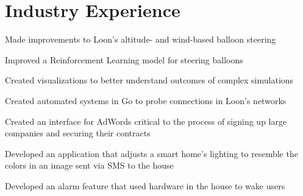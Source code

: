 \documentclass[letterpaper]{deedy-resume} %
\begin{document}
\begin{minipage}[t]{0.66\textwidth} %


\section{Industry Experience}


\vspace{\topsep} %
\begin{tightitemize}
    \item Made improvements to Loon's altitude- and wind-based balloon steering
    \item Improved a Reinforcement Learning model for steering balloons
    \item Created visualizations to better understand outcomes of complex simulations
    \item Created automated systems in Go to probe connections in Loon’s networks
\end{tightitemize}

\sectionspace %



\begin{tightitemize}
    \item Created an interface for AdWords critical to the process of signing up large companies and securing their contracts
\end{tightitemize}

\sectionspace %



\begin{tightitemize}
    \item Developed an application that adjusts a smart home's lighting to resemble the colors in an image sent via SMS to the house
    \item Developed an alarm feature that used hardware in the house to wake users
\end{tightitemize}


\end{minipage}
\end{document}
